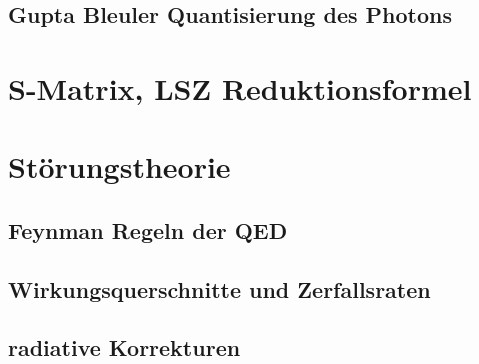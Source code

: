 \documentclass{include/thesisclass}
\begin{document}
\section{Gupta Bleuler Quantisierung des Photons}

\chapter{S-Matrix, LSZ Reduktionsformel}

\chapter{Störungstheorie}	
\section{Feynman Regeln der QED}
\section{Wirkungsquerschnitte und Zerfallsraten}
\section{radiative Korrekturen}
\end{document}

